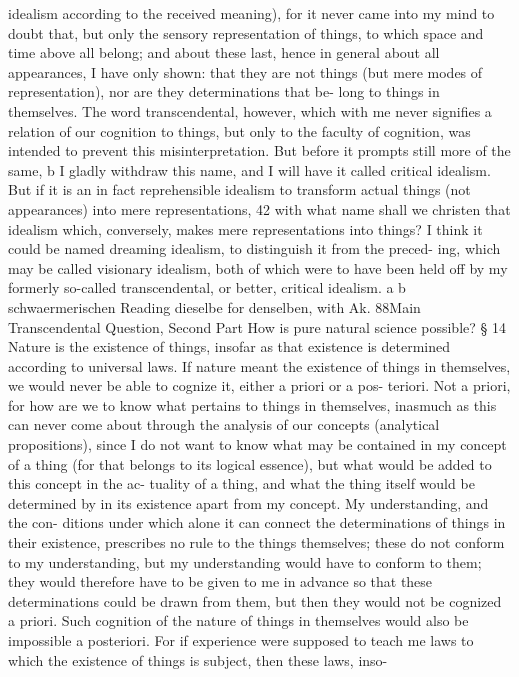 idealism according to the received meaning), for it never came into my
mind to doubt that, but only the sensory representation of things, to
which space and time above all belong; and about these last, hence in
general about all appearances, I have only shown: that they are not things
(but mere modes of representation), nor are they determinations that be-
long to things in themselves. The word transcendental, however, which
with me never signiﬁes a relation of our cognition to things, but only
to the faculty of cognition, was intended to prevent this misinterpretation.
But before it prompts still more of the same, b I gladly withdraw this
name, and I will have it called critical idealism. But if it is an in fact
reprehensible idealism to transform actual things (not appearances) into
mere representations, 42 with what name shall we christen that idealism
which, conversely, makes mere representations into things? I think it
could be named dreaming idealism, to distinguish it from the preced-
ing, which may be called visionary idealism, both of which were to have
been held off by my formerly so-called transcendental, or better, critical
idealism.
a
b
schwaermerischen
Reading dieselbe for denselben, with Ak.
88Main Transcendental Question,
Second Part
How is pure natural science possible?
§ 14
Nature is the existence of things, insofar as that existence is determined
according to universal laws. If nature meant the existence of things in
themselves, we would never be able to cognize it, either a priori or a pos-
teriori. Not a priori, for how are we to know what pertains to things in
themselves, inasmuch as this can never come about through the analysis
of our concepts (analytical propositions), since I do not want to know
what may be contained in my concept of a thing (for that belongs to
its logical essence), but what would be added to this concept in the ac-
tuality of a thing, and what the thing itself would be determined by in
its existence apart from my concept. My understanding, and the con-
ditions under which alone it can connect the determinations of things
in their existence, prescribes no rule to the things themselves; these do
not conform to my understanding, but my understanding would have to
conform to them; they would therefore have to be given to me in advance
so that these determinations could be drawn from them, but then they
would not be cognized a priori.
Such cognition of the nature of things in themselves would also be
impossible a posteriori. For if experience were supposed to teach me
laws to which the existence of things is subject, then these laws, inso-
